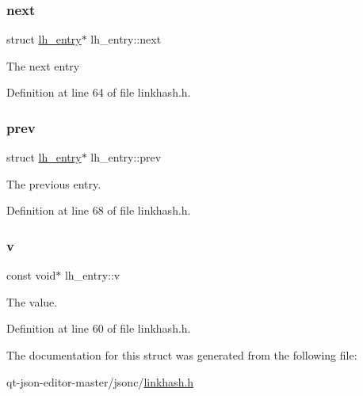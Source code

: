 \mbox{\label{structlh__entry_a7c40c46e72d9a0ba071a8d49d535bc67}} 
\subsubsection{\texorpdfstring{next}{next}}
{\footnotesize\ttfamily struct \hyperlink{structlh__entry}{lh\+\_\+entry}$\ast$ lh\+\_\+entry\+::next}

The next entry 

Definition at line 64 of file linkhash.\+h.

\mbox{\label{structlh__entry_a6fb9c3de01fb5af67d8d429921cc6a3b}} 
\subsubsection{\texorpdfstring{prev}{prev}}
{\footnotesize\ttfamily struct \hyperlink{structlh__entry}{lh\+\_\+entry}$\ast$ lh\+\_\+entry\+::prev}

The previous entry. 

Definition at line 68 of file linkhash.\+h.

\mbox{\label{structlh__entry_a1b676732ab2ad3eeaedf6ec60a6a0835}} 
\subsubsection{\texorpdfstring{v}{v}}
{\footnotesize\ttfamily const void$\ast$ lh\+\_\+entry\+::v}

The value. 

Definition at line 60 of file linkhash.\+h.



The documentation for this struct was generated from the following file\+:\begin{DoxyCompactItemize}
\item 
qt-\/json-\/editor-\/master/jsonc/\hyperlink{linkhash_8h}{linkhash.\+h}\end{DoxyCompactItemize}
